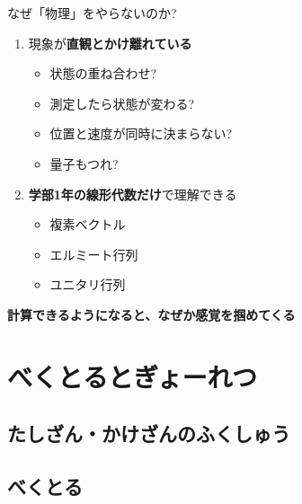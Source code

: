\documentclass[dvipdfm]{beamer}
\begin{document}
\begin{frame}{なぜ「物理」をやらないのか?}
    \begin{enumerate}
        \item 現象が\alert{\textbf{直観とかけ離れている}}
        \begin{itemize}
            \item 状態の重ね合わせ?
            \item 測定したら状態が変わる?
            \item 位置と速度が同時に決まらない?
            \item 量子もつれ?
        \end{itemize}
        \item \alert{\textbf{学部1年の線形代数だけ}}で理解できる
        \begin{itemize}
            \item 複素ベクトル
            \item エルミート行列
            \item ユニタリ行列
        \end{itemize}
    \end{enumerate}
    \textbf{計算できるようになると、なぜか感覚を掴めてくる}
\end{frame}



\section{べくとるとぎょーれつ}

\subsection{たしざん・かけざんのふくしゅう}


\subsection{べくとる}
\end{document}
